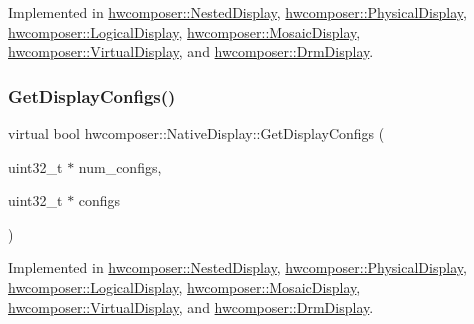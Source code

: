 Implemented in \mbox{\hyperlink{classhwcomposer_1_1NestedDisplay_aa63c8ca48c295a453afe8d9bec3d8561}{hwcomposer\+::\+Nested\+Display}}, \mbox{\hyperlink{classhwcomposer_1_1PhysicalDisplay_a7a76ed244ccea12e69c0fad38be23b84}{hwcomposer\+::\+Physical\+Display}}, \mbox{\hyperlink{classhwcomposer_1_1LogicalDisplay_a0ccbb1903cf15c1459f491aa1d3b3619}{hwcomposer\+::\+Logical\+Display}}, \mbox{\hyperlink{classhwcomposer_1_1MosaicDisplay_a7a03738eb7862a1b2e1585fbd80e710c}{hwcomposer\+::\+Mosaic\+Display}}, \mbox{\hyperlink{classhwcomposer_1_1VirtualDisplay_aa8dd83e78724b4b853a8d5e09ceffc56}{hwcomposer\+::\+Virtual\+Display}}, and \mbox{\hyperlink{classhwcomposer_1_1DrmDisplay_a7625a0b44daa5be9b7acf1bce235663e}{hwcomposer\+::\+Drm\+Display}}.

\mbox{\label{classhwcomposer_1_1NativeDisplay_a9479dcf82765996db6d7ea1cdcef3864}} 
\subsubsection{\texorpdfstring{Get\+Display\+Configs()}{GetDisplayConfigs()}}
{\footnotesize\ttfamily virtual bool hwcomposer\+::\+Native\+Display\+::\+Get\+Display\+Configs (\begin{DoxyParamCaption}\item[{uint32\+\_\+t $\ast$}]{num\+\_\+configs,  }\item[{uint32\+\_\+t $\ast$}]{configs }\end{DoxyParamCaption})\hspace{0.3cm}{\ttfamily [pure virtual]}}



Implemented in \mbox{\hyperlink{classhwcomposer_1_1NestedDisplay_a211f5d6783771f5bd7ffcf68566262ed}{hwcomposer\+::\+Nested\+Display}}, \mbox{\hyperlink{classhwcomposer_1_1PhysicalDisplay_af02d333622a2c80fd79387ce40253e62}{hwcomposer\+::\+Physical\+Display}}, \mbox{\hyperlink{classhwcomposer_1_1LogicalDisplay_a4df433d0a996e29197dfc23067a75ab4}{hwcomposer\+::\+Logical\+Display}}, \mbox{\hyperlink{classhwcomposer_1_1MosaicDisplay_a18bc1bc98ff2814c710ee1202f868217}{hwcomposer\+::\+Mosaic\+Display}}, \mbox{\hyperlink{classhwcomposer_1_1VirtualDisplay_ad432fc9a1edb46dff169f16f1bca6935}{hwcomposer\+::\+Virtual\+Display}}, and \mbox{\hyperlink{classhwcomposer_1_1DrmDisplay_a44114f544fbb9328f385085e30d900f1}{hwcomposer\+::\+Drm\+Display}}.

